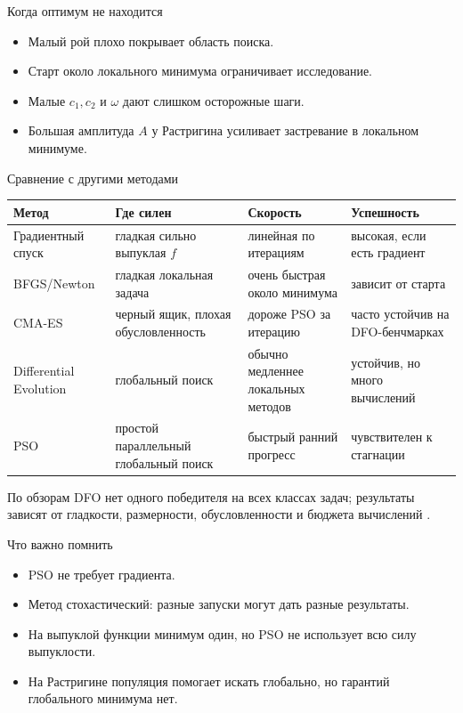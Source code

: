 \documentclass[aspectratio=169,11pt]{beamer}
\begin{document}
\begin{frame}{Когда оптимум не находится}
    \large
    \begin{itemize}
        \item Малый рой плохо покрывает область поиска.
        \item Старт около локального минимума ограничивает исследование.
        \item Малые \(c_1,c_2\) и \(\omega\) дают слишком осторожные шаги.
        \item Большая амплитуда \(A\) у Растригина усиливает застревание в локальном минимуме.
    \end{itemize}
\end{frame}

\begin{frame}{Сравнение с другими методами}
    \tiny
    \begin{tabular}{p{}p{}p{}p{}}
        \toprule
        Метод & Где силен & Скорость & Успешность\\
        \midrule
        Градиентный спуск & гладкая сильно выпуклая \(f\) & линейная по итерациям & высокая, если есть градиент\\
        BFGS/Newton & гладкая локальная задача & очень быстрая около минимума & зависит от старта\\
        CMA-ES & черный ящик, плохая обусловленность & дороже PSO за итерацию & часто устойчив на DFO-бенчмарках\\
        Differential Evolution & глобальный поиск & обычно медленнее локальных методов & устойчив, но много вычислений\\
        PSO & простой параллельный глобальный поиск & быстрый ранний прогресс & чувствителен к стагнации\\
        \bottomrule
    \end{tabular}
    \vspace{0.25cm}

    По обзорам DFO нет одного победителя на всех классах задач; результаты зависят от гладкости, размерности, обусловленности и бюджета вычислений \cite{rios2013dfo,auger2010comparison}.
\end{frame}

\begin{frame}{Что важно помнить}
    \large
    \begin{itemize}
        \item PSO не требует градиента.
        \item Метод стохастический: разные запуски могут дать разные результаты.
        \item На выпуклой функции минимум один, но PSO не использует всю силу выпуклости.
        \item На Растригине популяция помогает искать глобально, но гарантий глобального минимума нет.
    \end{itemize}
\end{frame}
\end{document}
